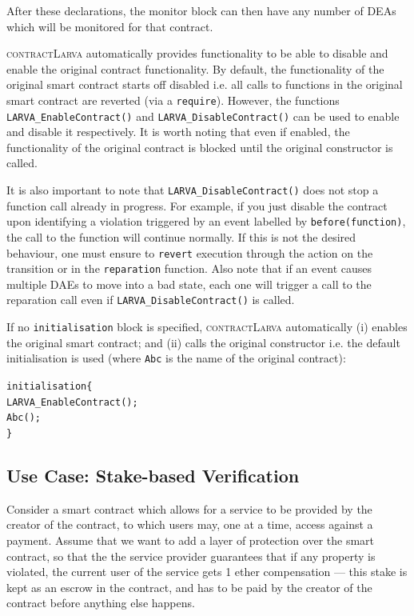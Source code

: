 \documentclass{article}
\newcommand{\contractlarva}{\textsc{contractLarva}\xspace}
\begin{document}
  After these declarations, the monitor block can then have any number of DEAs which will be monitored for that contract. 
 
 \contractlarva automatically provides functionality to be able to disable and enable the original contract functionality. By default, the functionality of the original smart contract starts off disabled i.e. all calls to functions in the original smart contract are reverted (via a \texttt{require}). However, the functions \texttt{LARVA\_EnableContract()} and \texttt{LARVA\_DisableContract()} can be used to enable and disable it respectively. It is worth noting that even if enabled, the functionality of the original contract is blocked until the original constructor is called.

  It is also important to note that \texttt{LARVA\_DisableContract()} does not stop a function call already in progress. For example, if you just disable the contract upon identifying a violation triggered by an event labelled by \texttt{before(function)}, the call to the function will continue normally. If this is not the desired behaviour, one must ensure to \texttt{revert} execution through the action on the transition or in the \texttt{reparation} function. Also note that if an event causes multiple DAEs to move into a bad state, each one will trigger a call to the reparation call even if \texttt{LARVA\_DisableContract()} is called.
    
  If no \texttt{initialisation} block is specified, \contractlarva automatically (i) enables the original smart contract; and (ii) calls the original constructor i.e. the default initialisation is used (where \texttt{Abc} is the name of the original contract):
  
  \small\begin{alltt}
    initialisation \{
      LARVA\_EnableContract();
      Abc();
    \}
  \end{alltt}\normalsize

  \subsection{Use Case: Stake-based Verification}
  \label{s:example}

  Consider a smart contract which allows for a service to be provided by the creator of the contract, to which users may, one at a time, access against a payment. Assume that we want to add a layer of protection over the smart contract, so that the the service provider guarantees that if any property is violated, the current user of the service gets 1 ether compensation --- this stake is kept as an escrow in the contract, and has to be paid by the creator of the contract before anything else happens. 
  
\end{document}
